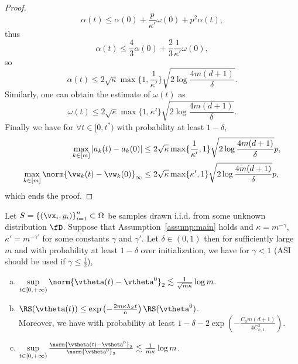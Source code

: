 \documentclass{article}
\begin{document}
\begin{proof}
\begin{equation}
        \alpha(t)\leq\alpha(0)+\frac{p}{\kappa'}\omega(0)+p^2\alpha(t),
    \end{equation}
    thus
    \begin{equation}
        \alpha(t)\leq\frac{4}{3}\alpha(0)+\frac{2}{3}\frac{1}{\kappa'}\omega(0),
    \end{equation}
    so
    \begin{equation}
        \alpha(t)\leq 2\sqrt{\kappa}\max\{1,\frac{1}{\kappa'}\}\sqrt{2\log\frac{4m(d+1)}{\delta}}.
    \end{equation}
    Similarly, one can obtain the estimate of $\omega(t)$ as
    \begin{equation}
        \omega(t)\leq 2\sqrt{\kappa}\max\{1,\kappa'\}\sqrt{2\log\frac{4m(d+1)}{\delta}}.
    \end{equation}
    Finally we have for $\forall t\in[0, t^*)$ with probability at least $1-\delta$,
    \begin{equation}
        \begin{aligned}
            \max\limits_{k\in[m]}|a_k(t) - a_k(0)|
             & \leq 2\sqrt{\kappa}\max\{\frac{1}{\kappa'},1\}\sqrt{2\log\frac{4m(d+1)}{\delta}}p, \\
            \max\limits_{k\in[m]}\norm{\vw_k(t) - \vw_k(0)}_{\infty}
             & \leq 2\sqrt{\kappa}\max\{
            \kappa',1\}\sqrt{2\log\frac{4m(d+1)}{\delta}}p,
        \end{aligned}
    \end{equation}
    which ends the proof.
\end{proof}
\begin{thm}\label{thm:main}
    Let $S = {\{(\vx_i, y_i)\}}_{i=1}^n\subset\Omega$ be samples drawn i.i.d. from some unknown distribution $\fD$. Suppose that Assumption~\ref{assump:main} holds and $\kappa=m^{-\gamma}$, $\kappa'=m^{-\gamma'}$ for some constants $\gamma$ and $\gamma'$. Let $\delta\in(0,1)$ then for sufficiently large $m$ and with probability at least $1-\delta$ over initialization, we have for $\gamma<1$ (ASI should be used if $\gamma\leq\frac{1}{2}$),
    \begin{enumerate}[(a)]
        \item $\sup\limits_{t\in[0,+\infty)}\norm{\vtheta(t)-\vtheta^0}_2\lesssim\frac{1}{\sqrt{m\kappa}}\log m$.
        \item $\RS(\vtheta(t))\leq \exp\left(-\frac{2m\kappa\lambda_S t}{n}\right)\RS(\vtheta^0)$. \\
              Moreover, we have with probability at least $1-\delta-2\exp\left(-\frac{C_0m(d+1)}{4C^2_{\psi,1}}\right)$.
        \item $\sup\limits_{t\in[0,+\infty)}\frac{\norm{\vtheta(t)-\vtheta^0}_2}{\norm{\vtheta^0}_2}\lesssim\frac{1}{m\kappa}\log m$.
    \end{enumerate}
\end{thm}
\end{document}
